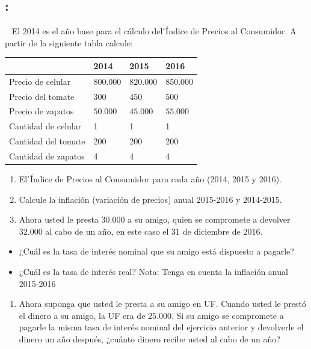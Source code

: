 \documentclass[
  letterpaper,
  DIV=11,
  numbers=noendperiod]{scrreport}
\providecommand{\tightlist}{%
  \setlength{\itemsep}{0pt}\setlength{\parskip}{0pt}}\usepackage{longtable,booktabs,array}
\begin{document}
\hypertarget{section-23}{%
\subsection{:}\label{section-23}}

~ El 2014 es el año base para el cálculo del ́Índice de Precios al
Consumidor. A partir de la siguiente tabla calcule:

\begin{table}[h]
    \centering
    \begin{tabular}{|p{50mm}|p{20mm}|p{20mm}|p{20mm}|}
        \hline
         & 2014 & 2015 & 2016 \\ \hline
        Precio de celular & $800.000$ & $820.000$ & $850.000$ \\ \hline
        Precio del tomate & $300$ & $450$ & $500$ \\ \hline
        Precio de zapatos & $50.000$ & $45.000$ & $55.000$ \\ \hline
        Cantidad de celular & 1 & 1 & 1 \\ \hline
        Cantidad del tomate & 200 & 200 & 200  \\ \hline
        Cantidad de zapatos & 4 & 4 & 4 \\ \hline
    \end{tabular}
\end{table}

\begin{enumerate}
\def\labelenumi{\alph{enumi})}
\item
  El ́Índice de Precios al Consumidor para cada año (2014, 2015 y 2016).
\item
  Calcule la inflación (variación de precios) anual 2015-2016 y
  2014-2015.
\item
  Ahora usted le presta \(30.000\) a su amigo, quien se compromete a
  devolver \(32.000\) al cabo de un año, en este caso el 31 de diciembre
  de 2016.
\end{enumerate}

\begin{itemize}
\item
  ¿Cuál es la tasa de interés nominal que su amigo está dispuesto a
  pagarle?
\item
  ¿Cuál es la tasa de interés real? Nota: Tenga en cuenta la inflación
  anual 2015-2016
\end{itemize}

\begin{enumerate}
\def\labelenumi{\alph{enumi})}
\setcounter{enumi}{3}
\tightlist
\item
  Ahora suponga que usted le presta a su amigo en UF. Cuando usted le
  prestó el dinero a su amigo, la UF era de \(25.000\). Si su amigo se
  compromete a pagarle la misma tasa de interés nominal del ejercicio
  anterior y devolverle el dinero un año después, ¿cuánto dinero recibe
  usted al cabo de un año?
\end{enumerate}
\end{document}
